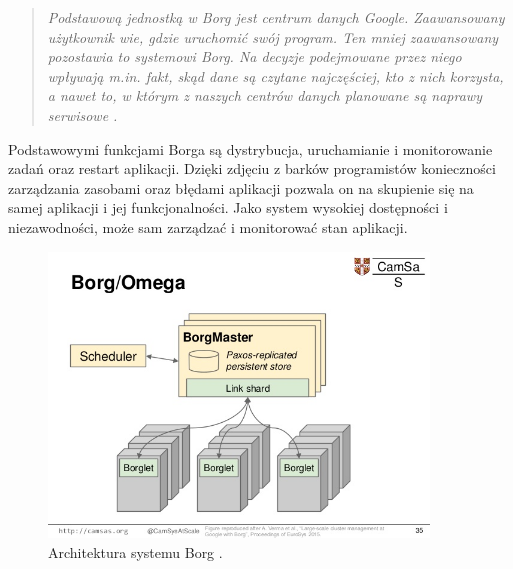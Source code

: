 \documentclass[12pt]{report}
\begin{document}
\begin{quote}
\it{Podstawową jednostką w Borg jest centrum danych Google. Zaawansowany użytkownik wie, gdzie uruchomić swój program. Ten mniej zaawansowany pozostawia to systemowi Borg. Na decyzje podejmowane przez niego wpływają m.in. fakt, skąd dane są czytane najczęściej, kto z nich korzysta, a nawet to, w którym z naszych centrów danych planowane są naprawy serwisowe \cite{borgArticle}.}
\end{quote}

Podstawowymi funkcjami Borga są dystrybucja, uruchamianie i monitorowanie zadań oraz restart aplikacji. Dzięki zdjęciu z barków programistów konieczności zarządzania zasobami oraz błędami aplikacji pozwala on na skupienie się na samej aplikacji i jej funkcjonalności. Jako system wysokiej dostępności i niezawodności, może sam zarządzać i monitorować stan aplikacji.

\begin{figure}[h]
	\centering
	\includegraphics[width=0.9\textwidth]{images/borgArch.jpg}
	\caption{Architektura systemu Borg \cite{borgArchImg}.}
\end{figure}
\end{document}
